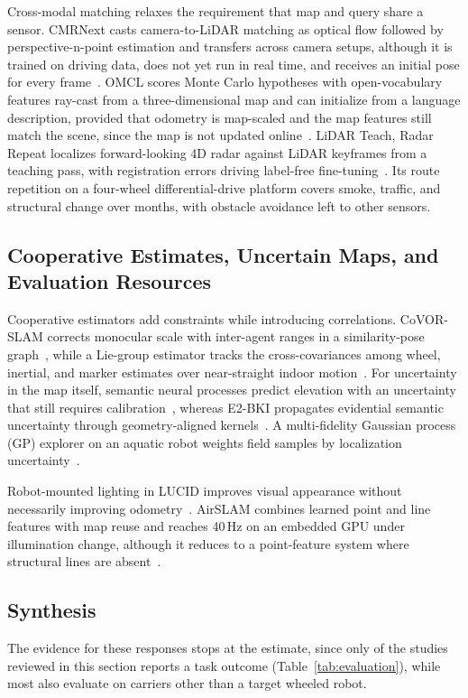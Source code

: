 Cross-modal matching relaxes the requirement that map and query share a sensor. CMRNext casts camera-to-LiDAR matching as optical flow followed by perspective-n-point estimation and transfers across camera setups, although it is trained on driving data, does not yet run in real time, and receives an initial pose for every frame~\cite{P_R06}. OMCL scores Monte Carlo hypotheses with open-vocabulary features ray-cast from a three-dimensional map and can initialize from a language description, provided that odometry is map-scaled and the map features still match the scene, since the map is not updated online~\cite{P_R10}. LiDAR Teach, Radar Repeat localizes forward-looking 4D radar against LiDAR keyframes from a teaching pass, with registration errors driving label-free fine-tuning~\cite{P_R11}. Its route repetition on a four-wheel differential-drive platform covers smoke, traffic, and structural change over months, with obstacle avoidance left to other sensors.

\subsection{Cooperative Estimates, Uncertain Maps, and Evaluation Resources}

Cooperative estimators add constraints while introducing correlations. CoVOR-SLAM corrects monocular scale with inter-agent ranges in a similarity-pose graph~\cite{P_F15}, while a Lie-group estimator tracks the cross-covariances among wheel, inertial, and marker estimates over near-straight indoor motion~\cite{P_E53}. For uncertainty in the map itself, semantic neural processes predict elevation with an uncertainty that still requires calibration~\cite{P_S46}, whereas E2-BKI propagates evidential semantic uncertainty through geometry-aligned kernels~\cite{P_R08}. A multi-fidelity Gaussian process (GP) explorer on an aquatic robot weights field samples by localization uncertainty~\cite{P_F10}.

Robot-mounted lighting in LUCID improves visual appearance without necessarily improving odometry~\cite{P_S20}. AirSLAM combines learned point and line features with map reuse and reaches 40\,Hz on an embedded GPU under illumination change, although it reduces to a point-feature system where structural lines are absent~\cite{P_R05}.

\subsection{Synthesis}

The evidence for these responses stops at the estimate, since only \LocTaskCount{} of the \LocTechCount{} studies reviewed in this section reports a task outcome (Table~\ref{tab:evaluation}), while most also evaluate on carriers other than a target wheeled robot.

